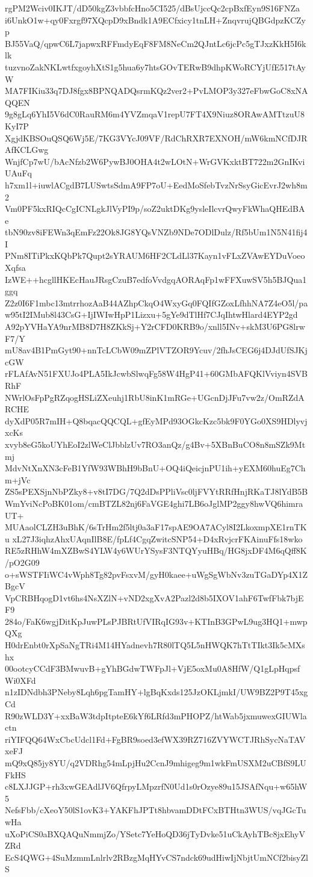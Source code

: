 rgPM2Wciv0IKJT/dD50kgZ3vbbfcHno5CI525/dBsUjccQc2cpBxfEyn9S16FNZa
i6UnkO1w+qy0Fxrgf97XQcpD9xBndk1A9ECfxicy1tnLH+ZnqvrujQBGdpzKCZyp
BJ55VaQ/qpwC6L7japwxRFFmdyEqF8FM8NeCm2QJntLc6jcPc5gTJxzKkH5I6klk
tuzvnoZakNKLwtfxgoyhXtS1g5hua6y7htsGOvTERwB9dhpKWoRCYjUfE517tAyW
MA7FIKiu33q7DJ8fgx8BPNQADQsrmKQz2ver2+PvLMOP3y327eFbwGoC8xNAQQEN
9g8gLq6YhI5V6dC0RauRM6m4YVZmqaV1repU7FT4X9Niuz8ORAwAMTtzuU8KyI7P
XgjdKBSOuQSQ6Wj5E/7KG3VYcJ09VF/RdChRXR7EXNOH/mW6kmNCfDJRAfKCLGwg
WnjfCp7wU/bAcNfzb2W6PywBJ0OHA4t2wLOtN+WrGVKxktBT722m2GnIKviUAuFq
h7xm1l+iuwlACgdB7LUSwtsSdmA9FP7oU+EedMoSfebTvzNrSsyGicEvrJ2wh8m2
Vm0PF5kxRIQcCgICNLgkJlVyPI9p/soZ2uktDKg9ysleIlcvrQwyFkWhaQHEdBAe
tbN90zv8iFEWn3qEmFz22Ok8JG8YQsVNZb9NDe7ODlDulz/Rf5bUm1N5N41fij4I
PNm8ITiPkxKQbPk7Qupt2sYRAUM6HF2CLdLl37Kayn1vFLxZVAwEYDuVoeoXqfsa
IzWE++hcgllHKEcHauJRsgCzuB7edfoVvdgqAORAqFp1wFFXuwSV5h5BJQua1ggq
Z2z0I6F1mbc13mtrrhozAaB44AZhpCkqO4WxyGq0FQIfGZoxLfhhNA7Z4eO5l/pa
w95tI2IMub8l43CsG+IjIWIwHpP1Lizxu+5gYe9dTlHf7CJqIhtwHlard4EYP2gd
A92pYVHaYA9nrMB8D7H8ZKkSj+Y2rCFD0KRB9o/xnll5INv+skM3U6PG8lrwF7/Y
mU8av4B1PmGyt90+nnTcLCbW09mZPlVTZOR9Ycuv/2fhJsCEG6j4DJdUfSJKjcGW
rFLAfAvN51FXUJo4PLA5IkJcwbSlwqFg58W4HgP41+60GMbAFQKlVviyn4SVBRhF
NWrlOsFpPgRZqogHSLiZXeuhj1RbU8inK1mRGe+UGcnDjJFu7vw2z/OmRZdARCHE
dyXdP05R7mIH+Q8bqacQQCQL+gfEyMPd93OGkcKzc5bk9F0YGo0XS9HDlyvjxcKs
xvyb8eG5koUYhEoI2zlWeClJbblzUv7RO3anQz/g4Bv+5XBnBuCO8n8mSZk9Mtmj
MdvNtXnXN3cFeB1YfW93WBhH9bBnU+OQ4iQeicjnPU1ih+yEXM60huEg7Chm+jVc
ZS5sPEXSjnNbPZky8+v8tI7DG/7Q2dDsPPliVsc0ljFVYtRRfHnjRKaTJ8lYdB5B
WmYviNcPoBK01om/cmBTZL82nj6FaVGE4ghi7LB6oJglMP2ggy8hwVQ6himraUT+
MUAaolCLZH3uBhK/6sTrHm2f5ltj0a3aF17spAE9OA7ACyl8I2LkoxmpXE1rnTKu
xL27J3iqhzAhxUAqnIlB8E/fpLf4CgqZwitcSNP54+D4xRvjcrFKAinuFfs18wko
RE5zRHhW4mXZBwS4YLW4y6WUrYSysF3NTQYyuHBq/HG8jxDF4M6qQff8K/pO2G09
o+sWSTFIiWC4vWph8Tg82pvFsxvM/gyH0kaee+uWgSgWbNv3zuTGaDYp4X1ZBgcV
VpCRBHqogD1vt6hs4NsXZlN+vND2xgXvA2Pazl2d8b5IXOV1ahF6TwfFbk7bjEF9
284o/FaK6wgjDitKpJuwPLsPJBRtUfVIRqIG93v+KTInB3GPwL9ug3HQ1+mwpQXg
H0drEnbt0rXpSaNgTRi4M14HYadnevh7R80lTQ5L5nHWQK7hTtTIkt3Ik5cMXshx
00ootcyCCdF3BMwuvB+gYhBGdwTWFpJl+VjE5oxMu0A8HfW/Q1gLpHqpsfWi0XFd
n1zIDNdbh3PNeby8Lqh6pgTamHY+lgBqKxds125JzOKLjmkI/UW9BZ2P9T45xgCd
R90zWLD3Y+xxBaW3tdpItpteE6kYf6LRfd3mPHOPZ/htWab5jxmuwexGIUWlactn
riYIFQQ64WxCbcUdcl1Fd+FgBR9soed3efWX39RZ716ZVYWCTJRhSycNaTAVxeFJ
mQ9xQ85jy8YU/q2VDRhg54mLpjHu2CcnJ9mhigeg9m1wkFmUSXM2uCBfS9LUFkHS
c8LXJJGP+rh3xwGEAdlJV6QfrpyLMpzrfN0Ud1s0rOzye89u15JSAfNqu+w65hW5
NefsFbb/cXeoY50lS1ovK3+YAKFhJPTt8hbvamDDtFCxBTHtn3WUS/vqJGcTuwHa
uXoPiCS0aBXQAQuNmmjZo/YSetc7YeHoQD36jTyDvke51uCkAyhTBc8jxEhyVZRd
EcS4QWG+4SuMzmmLnlrlv2RBzgMqHYvCS7ndck69udHiwIjNbjtUmNCf2bisyZlS
